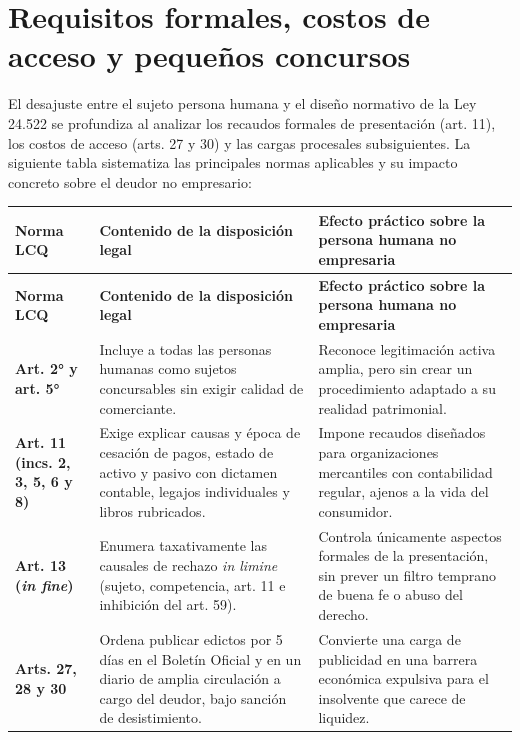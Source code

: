 \documentclass[12pt,oneside]{book}
\begin{document}
\section{Requisitos formales, costos de acceso y pequeños concursos}

El desajuste entre el sujeto persona humana y el diseño normativo de la Ley 24.522 se profundiza al analizar los recaudos formales de presentación (art. 11), los costos de acceso (arts. 27 y 30) y las cargas procesales subsiguientes. La siguiente tabla sistematiza las principales normas aplicables y su impacto concreto sobre el deudor no empresario:

{\small
\begin{longtable}{@{}>{\raggedright\arraybackslash}p{}>{\raggedright\arraybackslash}p{}>{\raggedright\arraybackslash}p{}@{}}
\toprule
\textbf{Norma LCQ} & \textbf{Contenido de la disposición legal} & \textbf{Efecto práctico sobre la persona humana no empresaria} \\
\midrule
\endfirsthead
\toprule
\textbf{Norma LCQ} & \textbf{Contenido de la disposición legal} & \textbf{Efecto práctico sobre la persona humana no empresaria} \\
\midrule
\endhead
\bottomrule
\endfoot
\textbf{Art. 2° y art. 5°} & Incluye a todas las personas humanas como sujetos concursables sin exigir calidad de comerciante. & Reconoce legitimación activa amplia, pero sin crear un procedimiento adaptado a su realidad patrimonial. \\
\addlinespace
\textbf{Art. 11 (incs. 2, 3, 5, 6 y 8)} & Exige explicar causas y época de cesación de pagos, estado de activo y pasivo con dictamen contable, legajos individuales y libros rubricados. & Impone recaudos diseñados para organizaciones mercantiles con contabilidad regular, ajenos a la vida del consumidor. \\
\addlinespace
\textbf{Art. 13 (\textit{in fine})} & Enumera taxativamente las causales de rechazo \textit{in limine} (sujeto, competencia, art. 11 e inhibición del art. 59). & Controla únicamente aspectos formales de la presentación, sin prever un filtro temprano de buena fe o abuso del derecho. \\
\addlinespace
\textbf{Arts. 27, 28 y 30} & Ordena publicar edictos por 5 días en el Boletín Oficial y en un diario de amplia circulación a cargo del deudor, bajo sanción de desistimiento. & Convierte una carga de publicidad en una barrera económica expulsiva para el insolvente que carece de liquidez. \\

\end{longtable}}
\end{document}
